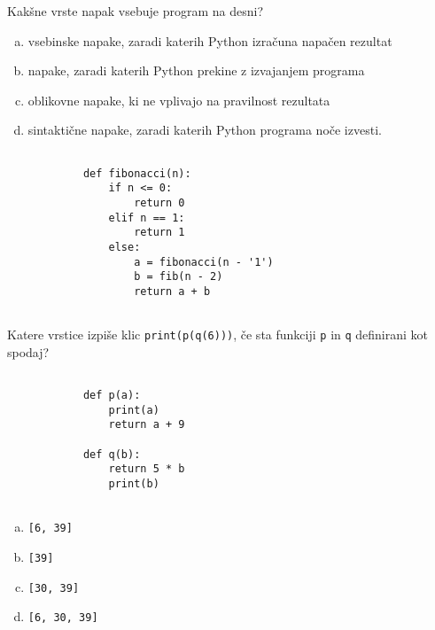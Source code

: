 \documentclass[arhiv, 10pt]{../izpit}
\newcommand{\inlinepy}[1]{\texttt{#1}}
\begin{document}
        \naloga*
        \begin{multicols}{2}
        \noindent
        Kakšne vrste napak vsebuje program na desni?

        \begin{enumerate}[(a)]
\item vsebinske napake, zaradi katerih Python izračuna napačen rezultat
\item napake, zaradi katerih Python prekine z izvajanjem programa
\item oblikovne napake, ki ne vplivajo na pravilnost rezultata
\item sintaktične napake, zaradi katerih Python programa noče izvesti.
\end{enumerate}

        \columnbreak

        \begin{verbatim}
        
            def fibonacci(n):
                if n <= 0:
                    return 0
                elif n == 1:
                    return 1
                else:
                    a = fibonacci(n - '1')
                    b = fib(n - 2)
                    return a + b
            
        \end{verbatim}

        \end{multicols}

    
        \naloga*
        Katere vrstice izpiše klic \inlinepy{print(p(q(6)))}, če sta funkciji \inlinepy{p} in \inlinepy{q} definirani kot spodaj?

        \begin{multicols}{2}
        \begin{verbatim}
        
            def p(a):
                print(a)
                return a + 9

            def q(b):
                return 5 * b
                print(b)
        
        \end{verbatim}

        \begin{enumerate}[(a)]
\item \inlinepy{[6, 39]}
\item \inlinepy{[39]}
\item \inlinepy{[30, 39]}
\item \inlinepy{[6, 30, 39]}
\end{enumerate}

        \end{multicols}
    
\end{document}
